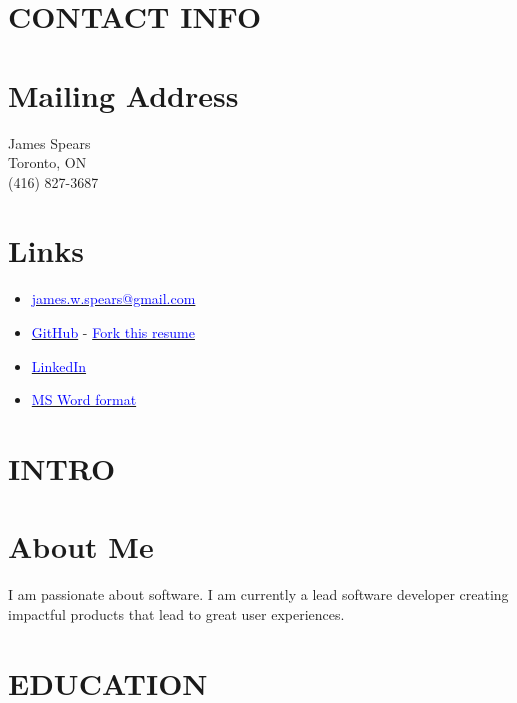 \documentclass[margin]{res}
\begin{document}
\name{\textcolor{NavyBlue}{James Spears} - \textcolor{black}{\bf Development Lead} }

\begin{resume}

	\section{\textcolor{NavyBlue}{CONTACT INFO}}

	\normalsize{\section{Mailing Address}}
	{James Spears \\ Toronto, ON \\ (416) 827-3687}

	\normalsize{\section{Links}}
	\begin{itemize}
		\item \href{mailto:james.w.spears@gmail.com}{\textcolor{blue}{james.w.spears@gmail.com}}
		\item \href{https://github.com/jameswspears}{\textcolor{blue}{GitHub}} - \href{https://github.com/jameswspears/resume}{\textcolor{blue}{Fork this resume}}
		\item \href{https://www.linkedin.com/in/james-spears-50834b8a/}{\textcolor{blue}{LinkedIn}}
		\item \href{https://s3.amazonaws.com/james-spears.com/resume.docx}{\textcolor{blue}{MS Word format}}
	\end{itemize}

	\section{\textcolor{NavyBlue}{INTRO}}

	\normalsize{\section{About Me}}
	I am passionate about software. I am currently a lead software developer creating impactful products that lead to great user experiences.
	\section{\textcolor{NavyBlue}{EDUCATION}}


\end{resume}
\end{document}

